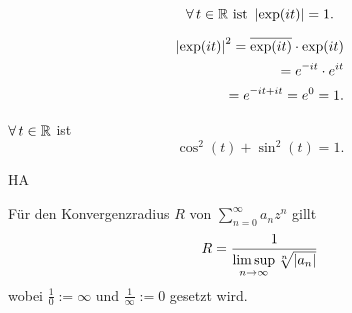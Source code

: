 \documentclass[../ana1.tex]{subfiles}
\begin{document}
\begin{satz}
    \[ \forall \, t\in\mathbb{R} \text{ ist } \left|\exp(it)\right| = 1. \]
\end{satz}
\begin{bew}
    \begin{align*}
        \abs{\exp(it)}^2 = \overline{\exp(it)} \cdot \exp(it)\\
        = e^{\minus i t} \cdot e^{it}\\
        = e^{\minus it + it} = e^0 = 1.
    \end{align*}
\end{bew}
\begin{kor}
    \( \forall \, t\in\mathbb{R} \) ist 
    \[ \cos^2 (t) + \sin^2 (t) = 1. \]
\end{kor}
\begin{bew}
    HA
\end{bew}
\begin{lem}
    Für den Konvergenzradius \( R \) von \( \sum_{n=0}^\infty a_n z^n \) gillt
    \[ R = \frac{1}{\limsup\limits_{n\rightarrow\infty} \sqrt[n]{\left|a_n\right|}} \]
    wobei \(\frac{1}{0} := \infty \) und \( \frac{1}{\infty} := 0 \) gesetzt wird.
\end{lem}
\end{document}
